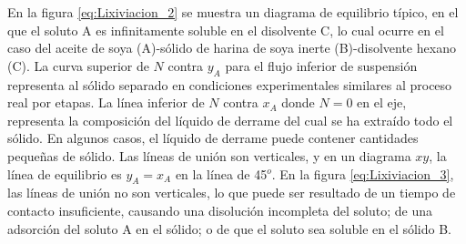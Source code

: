 \documentclass[11pt]{book}
\begin{document}
En la figura \ref{eq:Lixiviacion_2} se muestra un diagrama de equilibrio típico, en el que el soluto A es infinitamente soluble en el disolvente C, lo cual ocurre en el caso del aceite de soya (A)-sólido de harina de soya inerte (B)-disolvente hexano (C). La curva superior de $N$ contra $y_A$ para el flujo inferior de suspensión representa al sólido separado en condiciones experimentales similares al proceso real por etapas. La línea inferior de $N$ contra $x_A$ donde $N = 0$ en el eje, representa la composición del líquido de derrame del cual se ha extraído todo el sólido. En algunos casos, el líquido de derrame puede contener cantidades pequeñas de sólido. Las líneas de unión son verticales, y en un diagrama $xy$, la línea de equilibrio es $y_A = x_A$ en la línea de 45$^o$. En la figura \ref{eq:Lixiviacion_3}, las líneas de unión no son verticales, lo que puede ser resultado de un tiempo de contacto insuficiente, causando una disolución incompleta del soluto; de una adsorción del soluto A en el sólido; o de que el soluto sea soluble en el sólido B.
\end{document}
